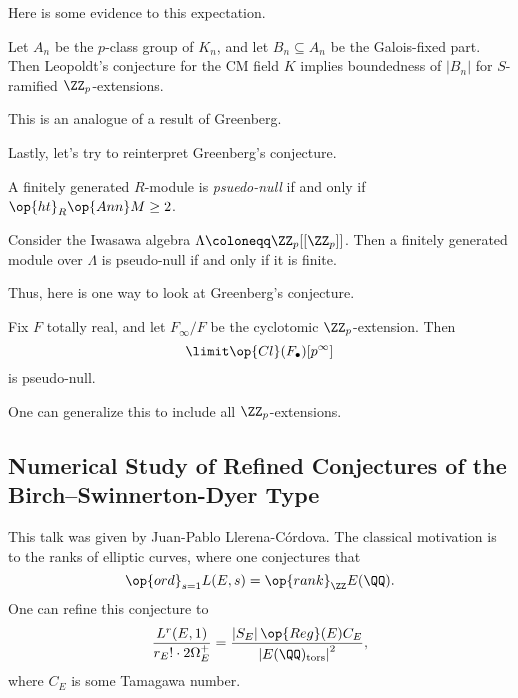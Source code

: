 \documentclass{article}
\begin{document}
Here is some evidence to this expectation.
\begin{proposition}
	Let $A_n$ be the $p$-class group of $K_n$, and let $B_n\subseteq A_n$ be the Galois-fixed part. Then Leopoldt's conjecture for the CM field $K$ implies boundedness of $\left|B_n\right|$ for $S$-ramified $\ZZ_p$-extensions.
\end{proposition}
This is an analogue of a result of Greenberg.

Lastly, let's try to reinterpret Greenberg's conjecture.
\begin{definition}
	A finitely generated $R$-module is \textit{psuedo-null} if and only if $\op{ht}_R\op{Ann}M\ge2$.
\end{definition}
\begin{example}
	Consider the Iwasawa algebra $\Lambda\coloneqq\ZZ_p[[\ZZ_p]]$. Then a finitely generated module over $\Lambda$ is pseudo-null if and only if it is finite.
\end{example}
Thus, here is one way to look at Greenberg's conjecture.
\begin{conj}[Greenberg]
	Fix $F$ totally real, and let $F_\infty/F$ be the cyclotomic $\ZZ_p$-extension. Then
	\[\limit\op{Cl}(F_\bullet)[p^\infty]\]
	is pseudo-null.
\end{conj}
One can generalize this to include all $\ZZ_p$-extensions.

\subsection{Numerical Study of Refined Conjectures of the Birch--Swinnerton-Dyer Type}
This talk was given by Juan-Pablo Llerena-C\'ordova. The classical motivation is to the ranks of elliptic curves, where one conjectures that
\[\op{ord}_{s=1}L(E,s)=\op{rank}_\ZZ E(\QQ).\]
One can refine this conjecture to
\[\frac{L^{r}(E,1)}{r_E!\cdot 2\Omega_E^+}=\frac{\left|S_E\right|\op{Reg}(E)C_E}{\left|E(\QQ)_{\mathrm{tors}}\right|^2},\]
where $C_E$ is some Tamagawa number.
\end{document}
